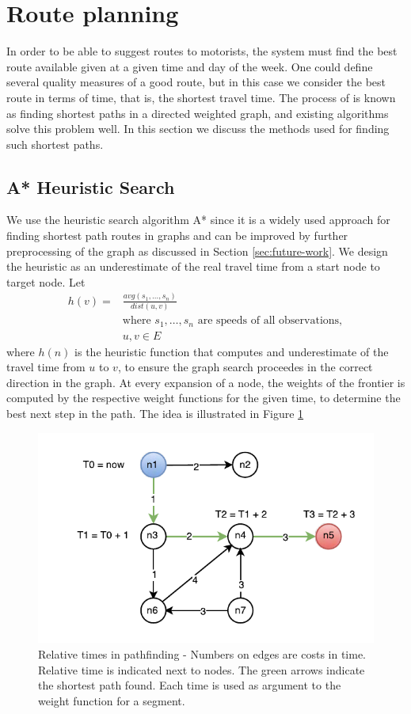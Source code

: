 \section{Route planning}
In order to be able to suggest routes to motorists, the system must find the best route available given at a given time and day of the week. One could define several quality measures of a good route, but in this case we consider the best route in terms of time, that is, the shortest travel time. The process of is known as finding shortest paths in a directed weighted graph, and existing algorithms solve this problem well. In this section we discuss the methods used for finding such shortest paths.

\subsection{A* Heuristic Search}\label{sec:pathfinding}
We use the heuristic search algorithm A* since it is a widely used approach for finding shortest path routes in graphs and can be improved by further preprocessing of the graph as discussed in Section \ref{sec:future-work}.
We design the heuristic as an underestimate of the real travel time from a start node to target node. Let 
\begin{align*}
h(v) = &\frac{avg(s_1,…,s_n)}{dist(u,v)} \\
&\text{where } s_1,…,s_n \text{ are speeds of all observations},\\
&u,v \in E
\end{align*}
where $h(n)$ is the heuristic function that computes and underestimate of the travel time from $u$ to $v$, to ensure the graph search proceedes in the correct direction in the graph.
At every expansion of a node, the weights of the frontier is computed by the respective weight functions for the given time, to determine the best next step in the path. The idea is illustrated in Figure \ref{fig:timed-graph} 
\begin{figure}
\centering
\includegraphics[width=\linewidth]{figures/timed-graph}
\caption{Relative times in pathfinding - Numbers on edges are costs in time. Relative time is indicated next to nodes. The green arrows indicate the shortest path found. Each time is used as argument to the weight function for a segment.}
\label{fig:timed-graph}
\end{figure}

